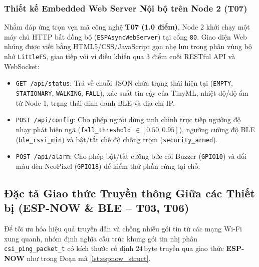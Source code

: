 \documentclass{hcmut-report}
\begin{document}
\subsubsection[Embedded Web Server Nội bộ trên Node 2 (T07)]{Thiết kế Embedded Web Server Nội bộ trên Node 2 (T07)}
Nhằm đáp ứng trọn vẹn mã công nghệ \textbf{T07 (1.0 điểm)}, Node 2 khởi chạy một máy chủ HTTP bất đồng bộ (\texttt{ESPAsyncWebServer}) tại cổng \texttt{80}. Giao diện Web nhúng được viết bằng HTML5/CSS/JavaScript gọn nhẹ lưu trong phân vùng bộ nhớ \texttt{LittleFS}, giao tiếp với vi điều khiển qua 3 điểm cuối RESTful API và WebSocket:
\begin{itemize}
  \item \texttt{GET /api/status}: Trả về chuỗi JSON chứa trạng thái hiện tại (\texttt{EMPTY}, \texttt{STATIONARY}, \texttt{WALKING}, \texttt{FALL}), xác suất tin cậy của TinyML, nhiệt độ/độ ẩm từ Node 1, trạng thái định danh BLE và địa chỉ IP.
  \item \texttt{POST /api/config}: Cho phép người dùng tinh chỉnh trực tiếp ngưỡng độ nhạy phát hiện ngã (\texttt{fall\_threshold} $\in [0.50, 0.95]$), ngưỡng cường độ BLE (\texttt{ble\_rssi\_min}) và bật/tắt chế độ chống trộm (\texttt{security\_armed}).
  \item \texttt{POST /api/alarm}: Cho phép bật/tắt cưỡng bức còi Buzzer (\texttt{GPIO10}) và đổi màu đèn NeoPixel (\texttt{GPIO18}) để kiểm thử phần cứng tại chỗ.
\end{itemize}

\subsection[Giao thức Truyền thông ESP-NOW và BLE (T03, T06)]{Đặc tả Giao thức Truyền thông Giữa các Thiết bị (ESP-NOW \& BLE -- T03, T06)}
Để tối ưu hóa hiệu quả truyền dẫn và chống nhiễu gói tin từ các mạng Wi-Fi xung quanh, nhóm định nghĩa cấu trúc khung gói tin nhị phân \texttt{csi\_ping\_packet\_t} có kích thước cố định $24\,\text{byte}$ truyền qua giao thức \textbf{ESP-NOW} như trong Đoạn mã \ref{lst:espnow_struct}.
\end{document}
